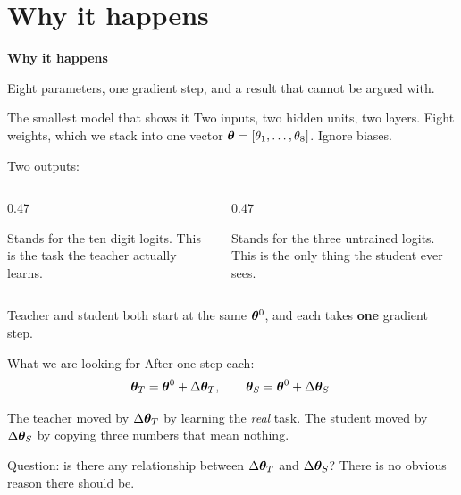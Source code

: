 \documentclass[aspectratio=169]{beamer}
\begin{document}
\section{Why it happens}
\begin{frame}[plain]
  \begin{center}
    {\Large\bfseries\color{popblue} Why it happens}

    \bigskip
    Eight parameters, one gradient step, and a result that cannot be argued with.
  \end{center}
\end{frame}

\begin{frame}{The smallest model that shows it}
  Two inputs, two hidden units, two layers. Eight weights, which we stack into one
  vector $\bm{\theta} = [\theta_1, \dots, \theta_8]$. Ignore biases.

  \medskip
  Two outputs:

  \medskip
  \begin{columns}[T]
    \begin{column}{0.47\textwidth}
      \begin{tcolorbox}[colback=armblue!8, colframe=armblue, boxrule=0.6pt, arc=2pt,
        title=\textbf{$f$ - the primary output}]
        Stands for the ten digit logits. This is the task the teacher actually learns.
      \end{tcolorbox}
    \end{column}
    \begin{column}{0.47\textwidth}
      \begin{tcolorbox}[colback=armorange!12, colframe=armorange, boxrule=0.6pt, arc=2pt,
        title=\textbf{$g$ - the auxiliary output}]
        Stands for the three untrained logits. This is the only thing the student ever sees.
      \end{tcolorbox}
    \end{column}
  \end{columns}

  \bigskip
  Teacher and student both start at the same $\bm{\theta}^0$, and each takes
  \textbf{one} gradient step.
\end{frame}

\begin{frame}{What we are looking for}
  After one step each:
  \[
    \bm{\theta}_T = \bm{\theta}^0 + \Delta\bm{\theta}_T,
    \qquad
    \bm{\theta}_S = \bm{\theta}^0 + \Delta\bm{\theta}_S .
  \]

  \medskip
  The teacher moved by $\Delta\bm{\theta}_T$ by learning the \emph{real} task. The student
  moved by $\Delta\bm{\theta}_S$ by copying three numbers that mean nothing.

  \bigskip
  \begin{tcolorbox}[colback=armblue!8, colframe=armblue, boxrule=0.6pt, arc=2pt]
    Question: is there any relationship between $\Delta\bm{\theta}_T$ and
    $\Delta\bm{\theta}_S$? There is no obvious reason there should be.
  \end{tcolorbox}
\end{frame}
\end{document}
